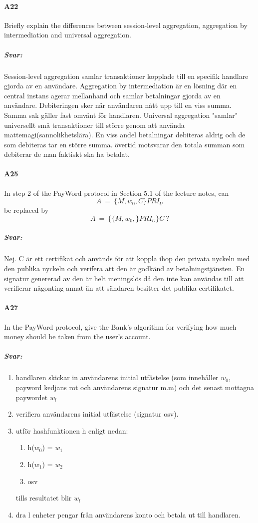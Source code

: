 \documentclass[a4paper]{article}
\begin{document}
\paragraph{A22} 
Briefly explain the differences between session-level aggregation, aggregation by intermediation and
universal aggregation.
\subparagraph{Svar:} Session-level aggregation samlar transaktioner kopplade till en specifik handlare gjorda av en användare. Aggregation by intermediation är en lösning där en central instans agerar mellanhand och samlar betalningar gjorda av en användare. Debiteringen sker när användaren nått upp till en viss summa. Samma sak gäller fast omvänt för handlaren. Universal aggregation "samlar" universellt små transaktioner till större genom att använda mattemagi(sannolikhetslära). En viss andel  betalningar debiteras aldrig och de som debiteras tar en större summa. övertid motsvarar den totala summan som debiterar de man faktiskt ska ha betalat. 


\paragraph{A25} 
In step 2 of the PayWord protocol in Section 5.1 of the lecture notes, can
\[A \ = \ \{ M,w_0,C  \}PRI_U\]  be replaced by \[A \ = \ \{ \{M,w_0,\}PRI_U \}C \ ? \] 
\subparagraph{Svar:} Nej. C är ett certifikat och används för att koppla ihop den privata nyckeln med den publika nyckeln och verifera att den är godkänd av betalningstjänsten. En signatur genererad av den är helt meningslös då den inte kan användas till att verifierar någonting annat än att sändaren besitter det publika certifikatet.

\paragraph{A27}
In the PayWord protocol, give the Bank’s algorithm for verifying how much money should be taken
from the user’s account.
\subparagraph{Svar:}
\begin{enumerate}
\item handlaren skickar in användarens initial utfästelse (som innehåller $w_0$, payword kedjans rot och användarens signatur m.m) och det senast mottagna paywordet $w_l$
\item verifiera användarens initial utfästelse (signatur osv).
\item utför hashfunktionen h enligt nedan: \begin{enumerate} 
											 \item h($w_0$) = $w_1$
											 \item h($w_1$) = $w_2$
											 \item osv
											 
							\end{enumerate}
							tills resultatet blir $w_l$
							
\item dra l enheter pengar från användarens konto och betala ut till handlaren.
\end{enumerate}
\end{document}
